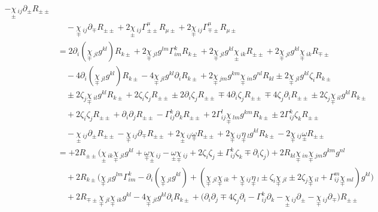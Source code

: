 \documentclass[a4paper,11pt]{article}
\numberwithin{equation}{section}
\theoremstyle{definition}
\begin{document}
\begin{align*}
    -\underset{\pm}{\chi}\,_{ij} \partial_\pm R_{\pm\pm}\\
    & \quad
    -\underset{\mp}{\chi}\,_{ij} \partial_\mp R_{\pm\pm}
    + 2 \underset{\pm}{\chi}\,_{ij} \Gamma_{\pm\pm}^\mu R_{\mu\pm}
    + 2 \underset{\mp}{\chi}\,_{ij} \Gamma_{\mp\pm}^\mu R_{\mu\pm}\\
    &= 2 \partial_i(\underset{\mp}{\chi}\,_{jl}g^{kl}) R_{k\pm}
    + 2 \underset{\mp}{\chi}\,_{jl}g^{lm} \Gamma_{im}^k R_{k\pm}
    + 2 \underset{\mp}{\chi}\,_{jl}g^{kl} \underset{\pm}{\chi}\,_{ik} R_{\pm\pm}
    + 2 \underset{\mp}{\chi}\,_{jl}g^{kl} \underset{\mp}{\chi}\,_{ik} R_{\mp\pm}\\
    &\quad
    - 4 \partial_i(\underset{\mp}{\chi}\,_{jl}g^{kl})  R_{k \pm}
    - 4 \underset{\mp}{\chi}\,_{jl}g^{kl}  \partial_i R_{k \pm}
    + 2 \underset{\mp}{\chi}\,_{jm}g^{km} \underset{\mp}{\chi}\,_{in}g^{nl} R_{kl}
    \pm 2 \underset{\mp}{\chi}\,_{jl}g^{kl} \zeta_i R_{k\pm}\\
    & \quad
    \pm 2 \zeta_j \underset{\mp}{\chi}\,_{il}g^{kl} R_{k\pm}
    + 2 \zeta_i \zeta_j R_{\pm\pm}
    \pm 2 \partial_i \zeta_j R_{\pm\pm}
    \mp 4 \partial_i\zeta_j R_{\pm\pm}
    \mp 4 \zeta_j \partial_i R_{\pm\pm}
    \pm 2 \zeta_j \underset{\mp}{\chi}\,_{il}g^{kl} R_{k\pm}\\
    & \quad
    + 2 \zeta_i \zeta_j R_{\pm\pm}
    + \partial_i \partial_j R_{\pm\pm}
    -\Gamma_{ij}^k \partial_k R_{\pm\pm}
    + 2 \Gamma_{ij}^l \underset{\mp}{\chi}\,_{lm}g^{km} R_{k\pm}
    \pm 2 \Gamma_{ij}^k \zeta_k R_{\pm\pm}\\
    &\quad 
    -\underset{\pm}{\chi}\,_{ij} \partial_\pm R_{\pm\pm}
    -\underset{\mp}{\chi}\,_{ij} \partial_\mp R_{\pm\pm}
    + 2 \underset{\pm}{\chi}\,_{ij} \underset{\mp}{\omega} R_{\pm\pm}
    + 2 \underset{\mp}{\chi}\,_{ij} \underset{\mp}{\eta}\,_l g^{kl} R_{k\pm}
    - 2 \underset{\mp}{\chi}\,_{ij} \underset{\pm}{\omega} R_{\pm\pm}\\
    &= 
    + 2 R_{\pm\pm} \Big( \underset{\pm}{\chi}\,_{ik} \underset{\mp}{\chi}\,_{jl}g^{kl}
    + \underset{\mp}{\omega} \underset{\pm}{\chi}\,_{ij}
    - \underset{\pm}{\omega} \underset{\mp}{\chi}\,_{ij}
    + 2 \zeta_i \zeta_j
    \pm \Gamma_{ij}^k \zeta_k 
    \mp \partial_i\zeta_j\Big)
    + 2 R_{kl} \underset{\mp}{\chi}\,_{in} \underset{\mp}{\chi}\,_{jm}g^{km}g^{nl}\\
    &\quad 
    + 2 R_{k\pm} \Big( \underset{\mp}{\chi}\,_{jl}g^{lm} \Gamma_{im}^k
    - \partial_i(\underset{\mp}{\chi}\,_{jl}g^{kl})
    + (\underset{\mp}{\chi}\,_{jl} \underset{\mp}{\chi}\,_{ik}
    + \underset{\mp}{\chi}\,_{ij} \underset{\mp}{\eta}\,_l
    \pm \zeta_i \underset{\mp}{\chi}\,_{jl}
    \pm 2 \zeta_j \underset{\mp}{\chi}\,_{il}
    + \Gamma_{ij}^m \underset{\mp}{\chi}\,_{ml} )g^{kl}\Big) \\
    &\quad 
    + 2 R_{\mp\pm} \underset{\mp}{\chi}\,_{jl} \underset{\mp}{\chi}\,_{ik} g^{kl}
    - 4 \underset{\mp}{\chi}\,_{jl}g^{kl}  \partial_i R_{k \pm}
    + \Big( \partial_i \partial_j
    \mp 4 \zeta_j \partial_i
    -\Gamma_{ij}^k \partial_k
    -\underset{\pm}{\chi}\,_{ij} \partial_\pm
    -\underset{\mp}{\chi}\,_{ij} \partial_\mp \Big) R_{\pm\pm}
\end{align*}
\end{document}
